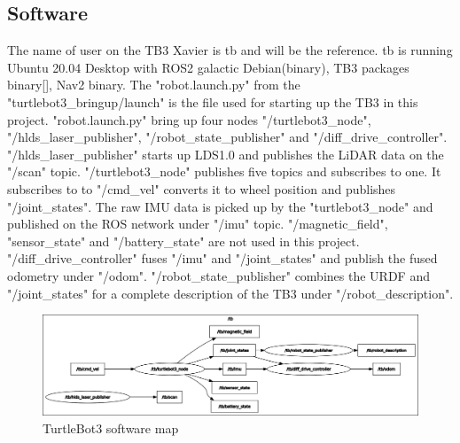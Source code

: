 \subsection{Software}
The name of user on the TB3 Xavier is tb and will be the reference. tb is running Ubuntu 20.04 Desktop with ROS2 galactic Debian(binary), TB3 packages binary[], Nav2 binary. The "robot.launch.py" from the "turtlebot3\_bringup/launch" is the file used for starting up the TB3 in this project. "robot.launch.py" bring up four nodes "/turtlebot3\_node", "/hlds\_laser\_publisher", "/robot\_state\_publisher" and "/diff\_drive\_controller". 
"/hlds\_laser\_publisher" starts up LDS1.0 and publishes the LiDAR data on the "/scan" topic. "/turtlebot3\_node" publishes five topics and subscribes to one. It subscribes to to "/cmd\_vel" converts it to wheel position and publishes "/joint\_states". The raw IMU data is picked up by the "turtlebot3\_node" and published on the ROS network under "/imu" topic. "/magnetic\_field", "sensor\_state" and "/battery\_state" are not used in this project. 
"/diff\_drive\_controller" fuses "/imu" and "/joint\_states" and publish the fused odometry under "/odom". 
"/robot\_state\_publisher" combines the URDF and "/joint\_states" for a complete description of the TB3 under "/robot\_description".

\begin{figure}[H]
    \centering
    \includegraphics[width = 1\textwidth]{Figures/drawio/tb_sw.png}
    \caption{TurtleBot3 software map}
    \label{fig:TB3SW}
\end{figure}